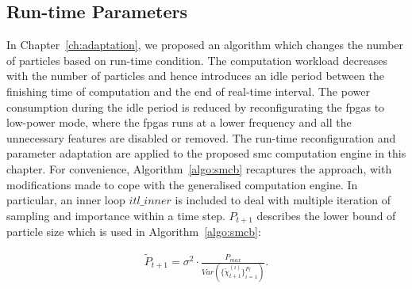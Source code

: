 \subsection{Run-time Parameters}

In Chapter~\ref{ch:adaptation}, we proposed an algorithm which changes the number of particles based on run-time condition.
The computation workload decreases with the number of particles and hence introduces an idle period between the finishing time of computation and the end of real-time interval.
The power consumption during the idle period is reduced by reconfigurating the \glspl{fpga} to low-power mode, where the \glspl{fpga} runs at a lower frequency and all the unnecessary features are disabled or removed.
The run-time reconfiguration and parameter adaptation are applied to the proposed \gls{smc} computation engine in this chapter.
For convenience, Algorithm~\ref{algo:smcb} recaptures the approach, with modifications made to cope with the generalised computation engine.
In particular, an inner loop $itl\_inner$ is included to deal with multiple iteration of sampling and importance within a time step.
$P_{t+1}$ describes the lower bound of particle size which is used in Algorithm~\ref{algo:smcb}:

\begin{equation}
\begin{aligned}
\widetilde{P}_{t+1} = \sigma^2 \cdot \frac{P_{max}}{Var(\{\widetilde{\chi}_{t+1}^{(i)}\}^{P_t}_{i=1})} \mbox{.}
\end{aligned}
\label{eqt:bound2b_ch5}
\end{equation}

